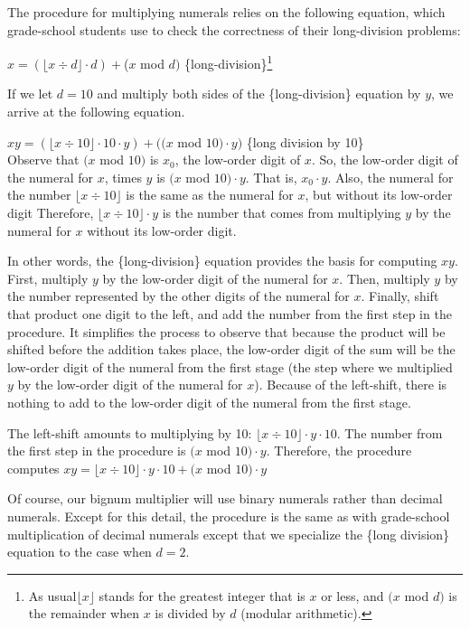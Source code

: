The procedure for multiplying numerals relies on the following equation,
which grade-school students use to check the correctness of their long-division problems:

\hspace{2mm} $x = (\lfloor x \div d \rfloor \cdot d) + $($x$ mod $d)$ \hfill \{long-division\}\footnote{As
usual$\lfloor x\rfloor$ stands for the greatest integer that is $x$ or less,
and $(x$ mod $d)$ is the remainder when $x$ is divided by $d$ (modular arithmetic).}

If we let $d = 10$ and multiply both sides of the \{long-division\} equation by $y$,
we arrive at the following equation.

\hspace{2cm} $xy = (\lfloor x \div 10 \rfloor \cdot 10 \cdot y) + ((x$ mod $10) \cdot y)$
\hfill \{long division by 10\} \\

Observe that $(x$ mod $10)$ is $x_0$, the low-order digit of $x$.
So, the low-order digit of the numeral for $x$, times $y$ is
$(x$ mod $10) \cdot y$. That is, $x_0 \cdot y$.
Also, the numeral for the number
$\lfloor x \div 10 \rfloor$ is the same as the numeral for $x$, but
without its low-order digit
Therefore, $\lfloor x \div 10 \rfloor \cdot y$ is the number that
comes from multiplying $y$ by the numeral for $x$ without its low-order digit.

In other words, the \{long-division\} equation
provides the basis for computing $xy$.
First, multiply $y$ by the low-order
digit of the numeral for $x$.
Then, multiply $y$ by the number
represented by the other digits of the numeral for $x$.
Finally, shift that product one digit to the left,
and add the number from the first step in the procedure.
It simplifies the process to observe that
because the product will be shifted before the addition takes place,
the low-order digit of the sum will be the low-order digit of
the numeral from the first stage
(the step where we multiplied $y$ by the low-order digit of the numeral for $x$).
Because of the left-shift, there is nothing to add to the low-order digit of
the numeral from the first stage.

The left-shift amounts to multiplying by 10: $\lfloor x \div 10 \rfloor \cdot y \cdot 10$.
The number from the first step in the procedure is $(x$ mod $10) \cdot y$.
Therefore, the procedure computes
$xy = \lfloor x \div 10 \rfloor \cdot y \cdot 10 + (x$ mod $10) \cdot y$

Of course, our bignum multiplier
will use binary numerals rather than decimal numerals.
Except for this detail, the procedure is the same
as with grade-school multiplication of decimal numerals
except that we specialize the \{long division\} equation to the case when $d = 2$.

